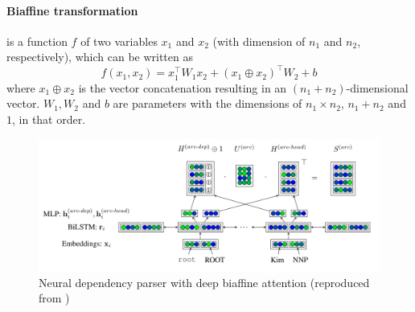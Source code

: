 \paragraph{Biaffine transformation} is a function $f$ of two variables $x_1$ and $x_2$ (with dimension of $n_1$ and $n_2$, respectively), which can be written as 
\begin{equation}
    f(x_1, x_2) = x_1^\top W_1 x_2 + (x_1\oplus x_2)^\top W_2 + b
\end{equation}
where $x_1 \oplus x_2 $ is the vector concatenation resulting in an $(n_1+n_2)$-dimensional vector. $W_1, W_2$ and $b$ are parameters with the dimensions of $n_1\times n_2$, $n_1+n_2$ and $1$, in that order.

\begin{figure}[t]
    \includegraphics[width=\textwidth]{img/biaffine-parser.png}
    \caption{Neural dependency parser with deep biaffine attention (reproduced from \cite{dozat:biaffine:2017})}
    \label{fig:biaffine-parser}
\end{figure}

